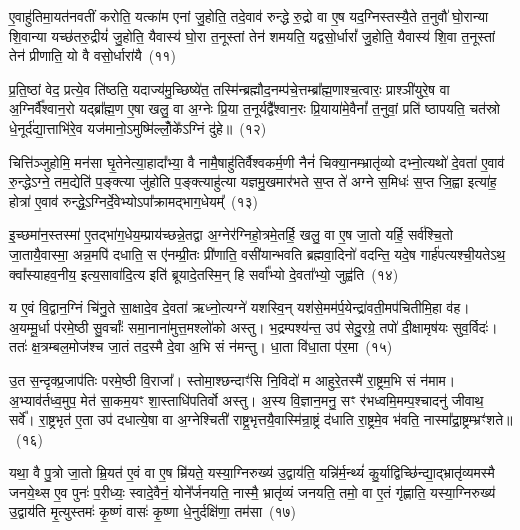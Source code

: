 ए॒वाहु॑तिमा॒यत॑नवतीं करोति॒ यत्का॑म एनां जु॒होति॒ तदे॒वाव॑ रुन्द्धे रु॒द्रो वा ए॒ष यद॒ग्निस्तस्यै॒ते त॒नुवौ॑ घो॒रान्या शि॒वान्या यच्छ॑तरु॒द्रीयं॑ जु॒होति॒ यैवास्य॑ घो॒रा त॒नूस्तां तेन॑ शमयति॒ यद्वसो॒र्धारां᳚ जु॒होति॒ यैवास्य॑ शि॒वा त॒नूस्तां तेन॑ प्रीणाति॒ यो वै वसो॒र्धारा॑यै~(११)

प्र॒ति॒ष्ठां वेद॒ प्रत्ये॒व ति॑ष्ठति॒ यदाज्य॑मु॒च्छिष्ये॑त॒ तस्मि॑न्ब्रह्मौद॒नम्प॑चे॒त्तम्ब्रा᳚ह्म॒णाश्च॒त्वारः॒ प्राश्ञी॑युरे॒ष वा अ॒ग्निर्वै᳚श्वान॒रो यद्ब्रा᳚ह्म॒ण ए॒षा खलु॒ वा अ॒ग्नेः प्रि॒या त॒नूर्यद्वै᳚श्वान॒रः प्रि॒याया॑मे॒वैनां᳚ त॒नुवां॒ प्रति॑ ष्ठापयति॒ चत॑स्रो धे॒नूर्द॑द्या॒त्ताभि॑रे॒व यज॑मानो॒\-ऽमुष्मि॑ल्लोँ॒के᳚\-ऽग्निं दु॑हे॥~(१२)

{\anuvakamend[{उपै॒तान्धारा॑यै॒ षट्च॑त्वारिꣳशच्च}]}%

चित्ति॑ञ्जुहोमि॒ मन॑सा घृ॒तेनेत्या॒हादा᳚भ्या॒ वै नामै॒षाहु॑तिर्वैश्वकर्म॒णी नैनं॑ चिक्या॒नम्भ्रातृ॑व्यो दभ्नो॒त्यथो॑ दे॒वता॑ ए॒वाव॑ रु॒न्द्धे\-ऽग्ने॒ तम॒द्येति॑ प॒ङ्क्त्या जु॑होति प॒ङ्क्त्याहु॑त्या यज्ञमु॒खमार॑भते स॒प्त ते॑ अग्ने स॒मिधः॑ स॒प्त जि॒ह्वा इत्या॑ह॒ होत्रा॑ ए॒वाव॑ रुन्द्धे॒\-ऽग्निर्दे॒वेभ्यो\-ऽपा᳚क्रामद्भाग॒धेयम्᳚~(१३)

इ॒च्छमा॑न॒स्तस्मा॑ ए॒तद्भा॑ग॒धेय॒म्प्राय॑च्छन्ने॒तद्वा अ॒ग्नेर॑ग्निहो॒त्रमे॒तर्\mbox{}हि॒ खलु॒ वा ए॒ष जा॒तो यर्\mbox{}हि॒ सर्व॑श्चि॒तो जा॒तायै॒वास्मा॒ अन्न॒मपि॑ दधाति॒ स ए॑नम्प्री॒तः प्री॑णाति॒ वसी॑यान्भवति ब्रह्मवा॒दिनो॑ वदन्ति॒ यदे॒ष गार्\mbox{}ह॑पत्यश्ची॒यते\-ऽथ॒ क्वा᳚स्याहव॒नीय॒ इत्य॒सावा॑दि॒त्य इति॑ ब्रूयादे॒तस्मि॒न् हि सर्वा᳚भ्यो दे॒वता᳚भ्यो॒ जुह्व॑ति~(१४)

य ए॒वं वि॒द्वान॒ग्निं चि॑नु॒ते सा॒क्षादे॒व दे॒वता॑ ऋध्नो॒त्यग्ने॑ यशस्वि॒न् यश॑से॒मम॑र्प॒येन्द्रा॑वती॒मप॑चितीमि॒हा व॑ह। अ॒यम्मू॒र्धा प॑रमे॒ष्ठी सु॒वर्चाः᳚ समा॒नाना॑मुत्त॒मश्लो॑को अस्तु। भ॒द्रम्पश्य॑न्त॒ उप॑ सेदु॒रग्रे॒ तपो॑ दी॒क्षामृष॑यः सुव॒र्विदः॑। ततः॑ क्ष॒त्रम्बल॒मोज॑श्च जा॒तं तद॒स्मै दे॒वा अ॒भि सं न॑मन्तु। धा॒ता वि॑धा॒ता प॑र॒मा~(१५)

उ॒त स॒न्दृक्प्र॒जाप॑तिः परमे॒ष्ठी वि॒राजा᳚। स्तोमा॒श्छन्दाꣳ॑सि नि॒विदो॑ म आहुरे॒तस्मै॑ रा॒ष्ट्रम॒भि सं न॑माम। अ॒भ्याव॑र्तध्व॒मुप॒ मेत॑ सा॒कम॒यꣳ शा॒स्ताधि॑पतिर्वो अस्तु। अ॒स्य वि॒ज्ञान॒मनु॒ सꣳ र॑भध्वमि॒मम्प॒श्चादनु॑ जीवाथ॒ सर्वे᳚। रा॒ष्ट्रभृत॑ ए॒ता उप॑ दधात्ये॒षा वा अ॒ग्नेश्चिती॑ राष्ट्र॒भृत्तयै॒वास्मि॑न्रा॒ष्ट्रं द॑धाति रा॒ष्ट्रमे॒व भ॑वति॒ नास्मा᳚द्रा॒ष्ट्रम्भ्रꣳ॑शते॥~(१६)

{\anuvakamend[{भा॒ग॒धेय॒ञ्जुह्व॑ति पर॒मा रा॒ष्ट्रं द॑धाति स॒प्त च॑}]}%

यथा॒ वै पु॒त्रो जा॒तो म्रि॒यत॑ ए॒वं वा ए॒ष म्रि॑यते॒ यस्या॒ग्निरुख्य॑ उ॒द्वाय॑ति॒ यन्नि॑र्म॒न्थ्यं॑ कु॒र्याद्विच्छि॑न्द्या॒द्भ्रातृ॑व्यमस्मै जनये॒थ्स ए॒व पुनः॑ प॒रीध्यः॒ स्वादे॒वैनं॒ योने᳚र्जनयति॒ नास्मै॒ भ्रातृ॑व्यं जनयति॒ तमो॒ वा ए॒तं गृ॑ह्णाति॒ यस्या॒ग्निरुख्य॑ उ॒द्वाय॑ति मृ॒त्युस्तमः॑ कृ॒ष्णं वासः॑ कृ॒ष्णा धे॒नुर्दक्षि॑णा॒ तम॑सा~(१७)

